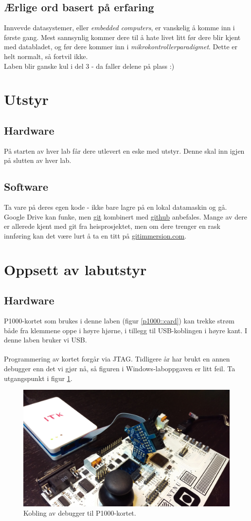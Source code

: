 \documentclass[11pt,a4paper]{article}
\begin{document}
\subsection{Ærlige ord basert på erfaring}
Innvevde datasystemer, eller \textit{embedded computers}, er vanskelig å komme inn i første gang. Mest sannsynlig kommer dere til å hate livet litt før dere blir kjent med databladet, og før dere kommer inn i \textit{mikrokontrollerparadigmet}. Dette er helt normalt, så fortvil ikke.\\
Laben blir ganske kul i del 3 - da faller delene på plass :)
\section{Utstyr}
\subsection{Hardware}
På starten av hver lab får dere utlevert en eske med utstyr. Denne skal inn igjen på slutten av hver lab.
\subsection{Software}
Ta vare på deres egen kode - ikke bare lagre på en lokal datamaskin og gå. Google Drive kan funke, men \href{https://git-scm.com/}{git} kombinert med \href{https://github.com/}{github} anbefales. Mange av dere er allerede kjent med git fra heisprosjektet, men om dere trenger en rask innføring kan det være lurt å ta en titt på \href{http://gitimmersion.com/}{gitimmersion.com}.
\section{Oppsett av labutstyr}
\subsection{Hardware}
\label{Setup::Hardware}
P1000-kortet som brukes i denne laben (figur \ref{p1000::card}) kan trekke strøm både fra klemmene oppe i høyre hjørne, i tillegg til USB-koblingen i høyre kant. I denne laben bruker vi USB.\\
\\
Programmering av kortet forgår via JTAG. Tidligere år har brukt en annen debugger enn det vi gjør nå, så figuren i Windows-laboppgaven er litt feil. Ta utgangspunkt i figur \ref{JTAG::conn}.
\begin{figure}[h]
\centering
\includegraphics[width=0.8\linewidth]{jtag.jpg}
\caption{Kobling av debugger til P1000-kortet.}
\label{JTAG::conn}
\end{figure}
\end{document}
